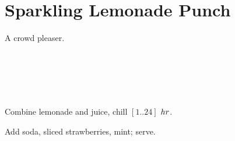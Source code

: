 \section[Lemonade Punch]{Sparkling Lemonade Punch}


\begin{recipestats}[
	servings=8,
	preptime=10~\minute,
	inactivetime=1~\hour,
	source=The~Gieskens,
]
\end{recipestats}

\begin{recipeabstract}
	A crowd pleaser.
\end{recipeabstract}


\begin{ingredientcolumns}[1]
	\begin{ingredientblock}
		\\
		\\
		\\
		\\
	\end{ingredientblock}
\end{ingredientcolumns}


\begin{preparation}
\item Combine lemonade and juice, chill $[1 .. 24]$ $\hour$.
\item Add soda, sliced strawberries, mint; serve.
\end{preparation}


\recipeend%
